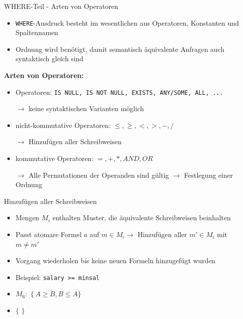 \documentclass{beamer}
\begin{document}
\begin{frame}[fragile]{WHERE-Teil - Arten von Operatoren}
\begin{itemize}
\item \verb|WHERE|-Ausdruck besteht im wesentlichen aus Operatoren, Konstanten und Spaltennamen
\item Ordnung wird benötigt, damit semantisch äquivalente Anfragen auch syntaktisch gleich sind
\end{itemize}
\textbf{Arten von Operatoren:}
\begin{itemize}
\item Operatoren: \verb|IS NULL, IS NOT NULL, EXISTS, ANY/SOME, ALL, ...|
\item[$\to$] keine syntaktischen Varianten möglich
\item nicht-kommutative Operatoren: $\leq,\geq,<,>,-,/$
\item[$\to$] Hinzufügen aller Schreibweisen
\item kommutative Operatoren: $=,+,*,AND,OR$
\item[$\to$] Alle Permutationen der Operanden sind gültig $\to$ Festlegung einer Ordnung
\end{itemize}

\end{frame}





\begin{frame}[fragile]{Hinzufügen aller Schreibweisen}
\begin{itemize}
\item Mengen $M_i$ enthalten Muster, die äquivalente Schreibweisen beinhalten
\item Passt atomare Formel $a$ auf $m\in M_i \to$ Hinzufügen aller $m'\in M_i$ mit $m\neq m'$
\item Vorgang wiederholen bis keine neuen Formeln hinzugefügt wurden
\item Beispiel: \verb|salary >= minsal|
\item $M_6:$  $\{\ A\geq B, B\leq A \}$
\item  $\{$    $\}$ 
\end{itemize}
\end{frame}
\end{document}
